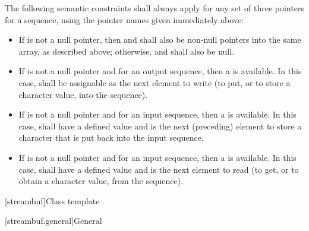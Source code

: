 \pnum
The following semantic constraints shall always apply for any set of
three pointers for a sequence, using the pointer names given immediately above:
\begin{itemize}
\item
If  is not a null pointer, then
 and  shall also be non-null pointers
into the same
array, as described above; otherwise,  and
 shall also be null.
\item
If  is not a null pointer and
for an output sequence, then a
is available.
In this case,
shall be assignable as the
next element to write
(to put, or to store a character value, into the sequence).
\item
If  is not a null pointer and
 for an input sequence,
then a
is available.
In this case,
shall have a defined value and is the next (preceding) element
to store a character that is put back into the input sequence.
\item
If  is not a null pointer and
 for an input sequence,
then a
is available.
In this case,
shall have a defined value
and is the next element to read
(to get, or to obtain a character value, from the sequence).
\end{itemize}

[streambuf]{Class template }

[streambuf.general]{General}

